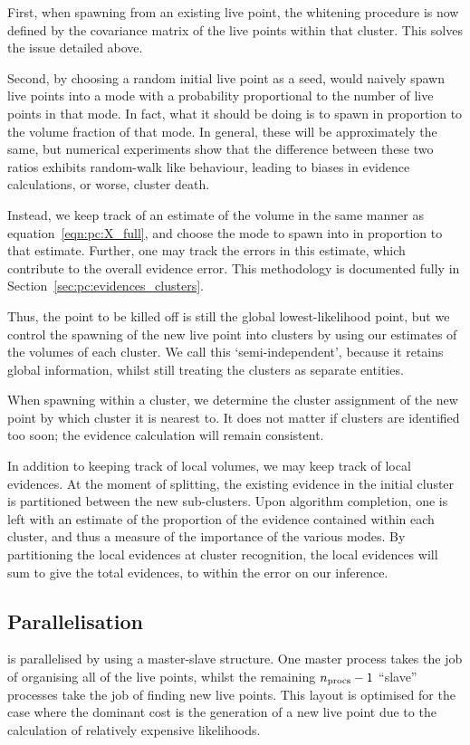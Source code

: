 First, when spawning from an existing live point, the whitening procedure is now defined by the covariance matrix of the live points within that cluster. This solves the issue detailed above.

Second, by choosing a random initial live point as a seed, \PolyChord{} would naively spawn live points into a mode with a probability proportional to the number of live points in that mode. In fact, what it should be doing is to spawn in proportion to the volume fraction of that mode. In general, these will be approximately the same, but numerical experiments show that the difference between these two ratios exhibits random-walk like behaviour, leading to biases in evidence calculations, or worse, cluster death. 

Instead, we keep track of an estimate of the volume in the same manner as equation~\eqref{eqn:pc:X_full}, and choose the mode to spawn into in proportion to that estimate. Further, one may track the errors in this estimate, which contribute to the overall evidence error. This methodology is documented fully in Section~\ref{sec:pc:evidences_clusters}.

Thus, the point to be killed off is still the global lowest-likelihood point, but we control the spawning of the new live point into clusters by using our estimates of the volumes of each cluster. We call this `semi-independent', because it retains global information, whilst still treating the clusters as separate entities. 

When spawning within a cluster, we determine the cluster assignment of the new point by which cluster it is nearest to. It does not matter if clusters are identified too soon; the evidence calculation will remain consistent.

In addition to keeping track of local volumes, we may keep track of local evidences. At the moment of splitting, the existing evidence in the initial cluster is partitioned between the new sub-clusters. Upon algorithm completion, one is left with an estimate of the proportion of the evidence contained within each cluster, and thus a measure of the importance of the various modes. By partitioning the local evidences at cluster recognition, the local evidences will sum to give the total evidences, to within the error on our inference.


\subsection{Parallelisation}
\label{sec:pc:parallelisation}
\PolyChord{} is parallelised by \openMPI{} using a master-slave structure.  One master process takes the job of organising all of the live points, whilst the remaining ${n_{\mathrm{procs}}-1}$ ``slave'' processes take the job of finding new live points. This layout is optimised for the case where the dominant cost is the generation of a new live point due to the calculation of relatively expensive likelihoods.

